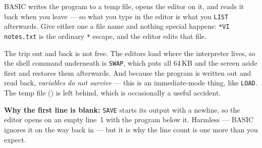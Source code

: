 \noindent BASIC writes the program to a temp file, opens the editor on it,
and reads it back when you leave --- so what you type in the editor is what
you \verb|LIST| afterwards. Give either one a file name and nothing special
happens: \verb|*VI notes.txt| is the ordinary \verb|*| escape, and the
editor edits that file.

The trip out and back is not free. The editors load where the interpreter
lives, so the shell command underneath is \verb|SWAP|, which puts all
64\,KB and the screen aside first and restores them afterwards. And because
the program is written out and read back, \emph{variables do not survive} ---
this is an immediate-mode thing, like \verb|LOAD|. The temp file
() is left behind, which is occasionally a useful accident.

\begin{aside}
\textbf{Why the first line is blank:} \verb|SAVE| starts its output with a
newline, so the editor opens on an empty line~1 with the program below it.
Harmless --- BASIC ignores it on the way back in --- but it is why the line
count is one more than you expect.
\end{aside}

